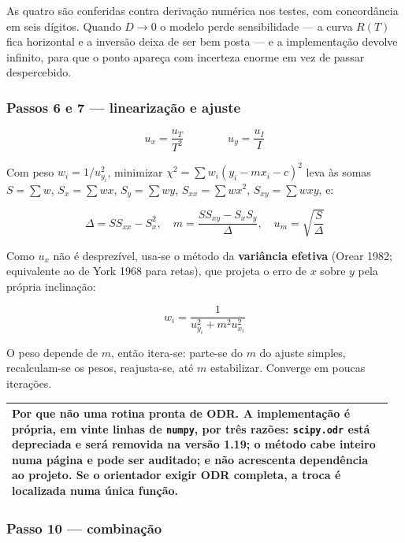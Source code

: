\documentclass[11pt,a4paper]{article}
\newenvironment{nota}
  {\par\medskip\noindent\begin{tabular}{|p{0.96\linewidth}|}\hline\rule{0pt}{3ex}}
  {\\[1ex]\hline\end{tabular}\par\medskip}
\begin{document}
As quatro são conferidas contra derivação numérica nos testes, com concordância
em seis dígitos. Quando $D \to 0$ o modelo perde sensibilidade --- a curva
$R(T)$ fica horizontal e a inversão deixa de ser bem posta --- e a
implementação devolve infinito, para que o ponto apareça com incerteza enorme
em vez de passar despercebido.

\subsubsection*{Passos 6 e 7 --- linearização e ajuste}

\begin{equation}
  u_x = \frac{u_T}{T^2}
  \qquad\qquad
  u_y = \frac{u_I}{I}
  \label{eq:eixos}
\end{equation}

Com peso $w_i = 1/u_{y_i}^2$, minimizar $\chi^2 = \sum w_i (y_i - m x_i - c)^2$
leva às somas $S = \sum w$, $S_x = \sum wx$, $S_y = \sum wy$,
$S_{xx} = \sum wx^2$, $S_{xy} = \sum wxy$, e:

\begin{equation}
  \Delta = S S_{xx} - S_x^2, \quad
  m = \frac{S S_{xy} - S_x S_y}{\Delta}, \quad
  u_m = \sqrt{\frac{S}{\Delta}}
  \label{eq:wls}
\end{equation}

Como $u_x$ não é desprezível, usa-se o método da \textbf{variância efetiva}
(Orear 1982; equivalente ao de York 1968 para retas), que projeta o erro de $x$
sobre $y$ pela própria inclinação:

\begin{equation}
  w_i = \frac{1}{u_{y_i}^2 + m^2 u_{x_i}^2}
  \label{eq:varefetiva}
\end{equation}

O peso depende de $m$, então itera-se: parte-se do $m$ do ajuste simples,
recalculam-se os pesos, reajusta-se, até $m$ estabilizar. Converge em poucas
iterações.

\begin{nota}
\textbf{Por que não uma rotina pronta de ODR.} A implementação é própria, em
vinte linhas de \texttt{numpy}, por três razões: \texttt{scipy.odr} está
depreciada e será removida na versão 1.19; o método cabe inteiro numa página e
pode ser auditado; e não acrescenta dependência ao projeto. Se o orientador
exigir ODR completa, a troca é localizada numa única função.
\end{nota}

\subsubsection*{Passo 10 --- combinação}
\end{document}

